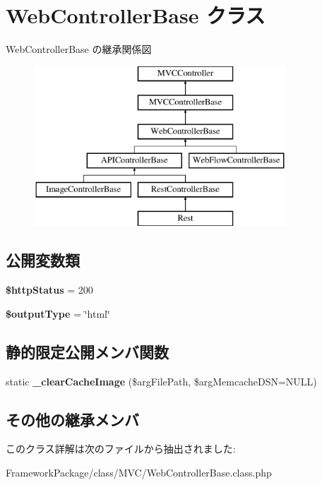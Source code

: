 \hypertarget{class_web_controller_base}{}\section{Web\+Controller\+Base クラス}
\label{class_web_controller_base}
Web\+Controller\+Base の継承関係図\begin{figure}[H]
\begin{center}
\leavevmode
\includegraphics[height=6.000000cm]{class_web_controller_base}
\end{center}
\end{figure}
\subsection*{公開変数類}
\begin{DoxyCompactItemize}
\item 
\hypertarget{class_web_controller_base_aa76c4fb55244a81dd4d15def490aad52}{}{\bfseries \$http\+Status} = 200\label{class_web_controller_base_aa76c4fb55244a81dd4d15def490aad52}

\item 
\hypertarget{class_web_controller_base_aa2e21eaa2c9dcf86a2ea70af99400636}{}{\bfseries \$output\+Type} = \char`\"{}html\char`\"{}\label{class_web_controller_base_aa2e21eaa2c9dcf86a2ea70af99400636}

\end{DoxyCompactItemize}
\subsection*{静的限定公開メンバ関数}
\begin{DoxyCompactItemize}
\item 
\hypertarget{class_web_controller_base_a950063303910b8909b697f3faec17700}{}static {\bfseries \+\_\+clear\+Cache\+Image} (\$arg\+File\+Path, \$arg\+Memcache\+D\+S\+N=N\+U\+L\+L)\label{class_web_controller_base_a950063303910b8909b697f3faec17700}

\end{DoxyCompactItemize}
\subsection*{その他の継承メンバ}


このクラス詳解は次のファイルから抽出されました\+:\begin{DoxyCompactItemize}
\item 
Framework\+Package/class/\+M\+V\+C/Web\+Controller\+Base.\+class.\+php\end{DoxyCompactItemize}

